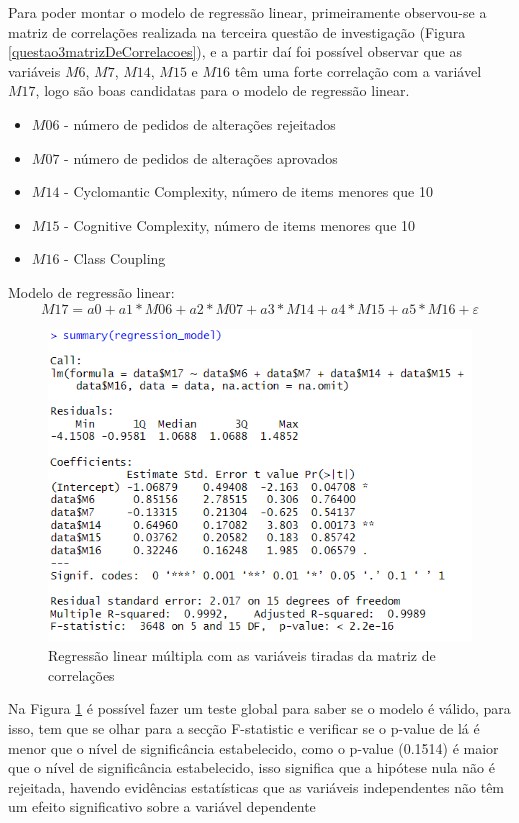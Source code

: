 \documentclass[%
 aip,
cp,  %
 amsmath,amssymb,%
 reprint,%
]{revtex4-2}
\begin{document}
Para poder montar o modelo de regressão linear, primeiramente observou-se a matriz de correlações realizada na terceira questão de investigação (Figura \ref{questao3matrizDeCorrelacoes}), e a partir daí foi possível observar que as variáveis $M6$, $M7$, $M14$, $M15$ e $M16$ têm uma forte correlação com a variável $M17$, logo são boas candidatas para o modelo de regressão linear.

\begin{itemize}
    \item $M06$ - número de pedidos de alterações rejeitados
    \item $M07$ - número de pedidos de alterações aprovados
    \item $M14$ - Cyclomantic Complexity, número de items menores que 10
    \item $M15$ - Cognitive Complexity, número de items menores que 10
    \item $M16$ - Class Coupling
\end{itemize}

Modelo de regressão linear: \[ M17 = a0 + a1*M06 + a2*M07 + a3*M14 + a4*M15 + a5*M16 + \varepsilon\]

  \begin{figure}[!h]
      \centering
      \includegraphics[width=0.6\linewidth]{imagens//questao4/primeiraRegressao.png}
      \caption{Regressão linear múltipla com as variáveis tiradas da matriz de correlações}
      \label{fig:primeiraRegressaoQuartaQuestao}
  \end{figure}

Na Figura \ref{fig:primeiraRegressaoQuartaQuestao} é possível fazer um teste global para saber se o modelo é válido, para isso,  tem que se olhar para a secção F-statistic e verificar se o p-value de lá é menor que o nível de significância estabelecido, como o p-value (0.1514) é maior que o nível de significância estabelecido, isso significa que a hipótese nula não é rejeitada, havendo evidências estatísticas que as variáveis independentes não têm um efeito significativo sobre a variável dependente
\end{document}
